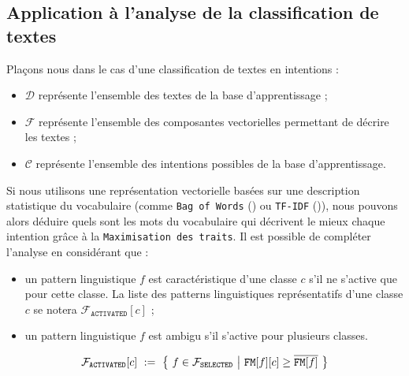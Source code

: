 	
	\subsection{Application à l'analyse de la classification de textes}
	\label{annex:C.3.4-DESCRIPTION-IMPLEMENTATION-FEATURES-MAXIMIZATION-METRIC-APPLICATION-TEXTES}
	
		Plaçons nous dans le cas d'une classification de textes en intentions :
		\begin{itemize}
			\item $\mathcal{D}$ représente l'ensemble des textes de la base d'apprentissage ;
			\item $\mathcal{F}$ représente l'ensemble des composantes vectorielles permettant de décrire les textes ;
			\item $\mathcal{C}$ représente l'ensemble des intentions possibles de la base d'apprentissage.
		\end{itemize}
		
		Si nous utilisons une représentation vectorielle basées sur une description statistique du vocabulaire (comme \texttt{Bag of Words} (\cite{harris:1954:distributional-structure}) ou \texttt{TF-IDF} (\cite{ramos:2003:using-tfidf-determine})), nous pouvons alors déduire quels sont les mots du vocabulaire qui décrivent le mieux chaque intention grâce à la \texttt{Maximisation des traits}.
		Il est possible de compléter l'analyse en considérant que :
		\begin{itemize}
			\item un pattern linguistique $f$ est caractéristique d'une classe $c$ s'il ne s'active que pour cette classe. La liste des patterns linguistiques représentatifs d'une classe $c$ se notera $\mathcal{F}_{\texttt{ACTIVATED}}[c]$ ;
			\item un pattern linguistique $f$ est ambigu s'il s'active pour plusieurs classes.
		\end{itemize}
		
		\begin{equation}
			\label{equation:C.3.4-DESCRIPTION-IMPLEMENTATION-FEATURES-MAXIMIZATION-METRIC-PATTERN-ACTIVATION}
			\mathcal{F}_{\texttt{ACTIVATED}}[c]
				~:=~\bigl\{~
					f \in \mathcal{F}_{\texttt{SELECTED}}
					~\big|~
					\texttt{FM}[f][c] \geq \overline{\texttt{FM}[f]}
				~\bigr\} \\
		\end{equation}
		
